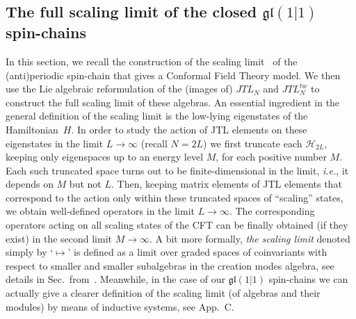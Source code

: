 \documentclass[11pt]{article}
\newcommand{\JTL}[1]{JTL_{#1}}
\newcommand{\Hilb}{\mathcal{H}}
\newcommand{\gl}{\mathfrak{gl}}
\newcommand{\AppLim}{C}
\theoremstyle{definition}
\begin{document}
\subsection{The full scaling limit of the closed $\gl(1|1)$ spin-chains}\label{sec:scaling}
In this section, we recall the construction of the scaling limit~\cite{GRS1} of
 the (anti)periodic spin-chain that gives a Conformal Field Theory model. We then use  the  Lie algebraic reformulation of the (images of) $\JTL{N}$ and $\JTL{N}^{tw}$  to construct the full scaling limit of these algebras. An essential ingredient  in the general definition
 of the scaling limit   is
 the low-lying eigenstates of the Hamiltonian~$H$. In order to study the
 action of JTL elements on these eigenstates in the limit $L\to\infty$
 (recall $N=2L$) we first truncate each $\Hilb_{2L}$, keeping only
 eigenspaces up to an energy level $M$, for each positive number $M$.
 Each such truncated space turns out to be finite-dimensional in the
 limit, {\it i.e.}, it depends on $M$ but not $L$. Then, keeping matrix
 elements of JTL elements that correspond to the action only within
 these truncated spaces of ``scaling'' states, we obtain well-defined
 operators in the limit $L\to\infty$. The corresponding operators
 acting on all scaling states of the CFT can be finally obtained (if
 they exist) in the second limit $M\to\infty$.
A bit more formally, \textit{the scaling limit} denoted
simply by `$\mapsto$' is defined as a limit over graded spaces of coinvariants with
respect to smaller and smaller subalgebras in the creation modes
algebra, see details in  Sec.~\GRSscallim from~\cite{GRS1}. Meanwhile, in the case of our $\gl(1|1)$ spin-chains we can actually give a  clearer definition of the scaling limit (of algebras and their modules) by means of inductive systems, see App.~\AppLim.
\end{document}
